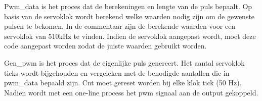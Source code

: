 
Pwm\_data is het proces dat de berekeningen en lengte van de puls bepaalt. Op basis van de servoklok wordt berekend welke waarden nodig zijn om de gewenste pulsen te bekomen. In de commentaar zijn de berekende waarden voor een servoklok van 510kHz te vinden. Indien de servoklok aangepast wordt, moet deze code aangepast worden zodat de juiste waarden gebruikt worden.


Gen\_pwm is het proces dat de eigenlijke puls genereert. Het aantal servoklok ticks wordt bijgehouden en vergeleken met de benodigde aantallen die in pwm\_data bepaald zijn. Cnt moet gereset worden bij elke klok tick (50 Hz).\\
Nadien wordt met een one-line process het pwm signaal aan de output gekoppeld.

